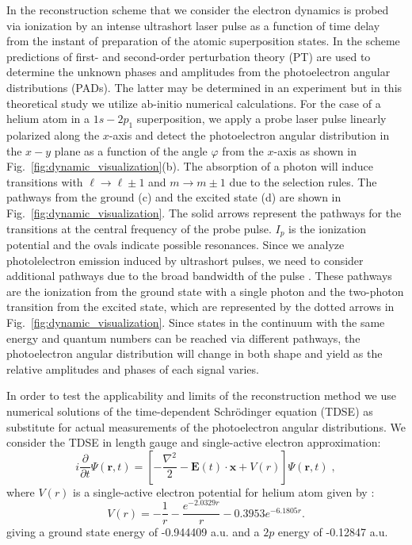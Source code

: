 In the reconstruction scheme that we consider the electron dynamics is probed via ionization by an intense ultrashort laser pulse as a function of time delay from the instant of preparation of the atomic superposition states. In the scheme predictions of first- and second-order perturbation theory (PT) are used to determine the unknown phases and amplitudes from the photoelectron angular distributions (PADs). The latter may be determined in an experiment but in this theoretical study we utilize ab-initio numerical calculations. For the case of a helium atom in a $1s-2p_1$ superposition, we apply a probe laser pulse linearly polarized along the $x$-axis and detect the photoelectron angular distribution in the $x-y$ plane as a function of the angle $\varphi$ from the $x$-axis as shown in Fig.~\ref{fig:dynamic_visualization}(b). The absorption of a photon will induce transitions with $\ell \rightarrow \ell \pm 1$ and $m \rightarrow m \pm 1$ due to the selection rules. The pathways from the ground (c) and the excited state (d) are shown in Fig.\ \ref{fig:dynamic_visualization}. The solid arrows represent the pathways for the transitions at the central frequency of the probe pulse. $I_p$ is the ionization potential and the ovals indicate possible resonances. Since we analyze photolelectron emission induced by ultrashort pulses, we need to consider additional pathways due to the broad bandwidth of the pulse \cite{venzke_ionization_2020}. These pathways are the ionization from the ground state with a single photon and the two-photon transition from the excited state, which are represented by the dotted arrows in Fig.~\ref{fig:dynamic_visualization}. Since states in the continuum with the same energy and quantum numbers can be reached via different pathways, the photoelectron angular distribution will change in both shape and yield as the relative amplitudes and phases of each signal varies.


In order to test the applicability and limits of the reconstruction method we use numerical solutions of the time-dependent Schr\"odinger equation (TDSE) as substitute for actual measurements of the photoelectron angular distributions. We consider the TDSE in length gauge and single-active electron approximation:
%
\begin{equation}
i\frac{\partial}{\partial t}\Psi(\mathbf{r},t) = \left[-\frac{\nabla^2}{2} - \mathbf{E}(t) \cdot \mathbf{x} + V(r)\right]\Psi(\mathbf{r},t)\; ,
\end{equation}
%
where $V(r)$ is a single-active electron potential for helium atom given by \cite{reiff_single-active_2020}:
%
\begin{equation}
V(r) = -\frac{1}{r} - \frac{e^{-2.0329r}}{r} - 0.3953 e^{-6.1805r}.
\end{equation}
%
giving a ground state energy of -0.944409 a.u. and a $2p$ energy of -0.12847 a.u.

